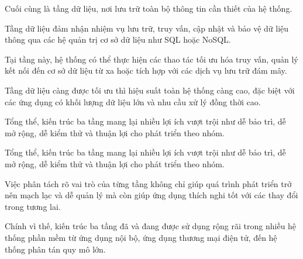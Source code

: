     \begin{flushleft}
      \hspace*{0.8cm}Cuối cùng là tầng dữ liệu, nơi lưu trữ toàn bộ thông tin cần thiết của hệ thống.
    \end{flushleft}

    \begin{flushleft}
      \hspace*{0.8cm}Tầng dữ liệu đảm nhận nhiệm vụ lưu trữ, truy vấn, cập nhật và bảo vệ dữ liệu thông qua các hệ quản trị cơ sở dữ liệu như SQL hoặc NoSQL.
    \end{flushleft}

    \begin{flushleft}
      \hspace*{0.8cm}Tại tầng này, hệ thống có thể thực hiện các thao tác tối ưu hóa truy vấn, quản lý kết nối đến cơ sở dữ liệu từ xa hoặc tích hợp với các dịch vụ lưu trữ đám mây.
    \end{flushleft}

    \begin{flushleft}
      \hspace*{0.8cm}Tầng dữ liệu càng được tối ưu thì hiệu suất toàn hệ thống càng cao, đặc biệt với các ứng dụng có khối lượng dữ liệu lớn và nhu cầu xử lý đồng thời cao.
    \end{flushleft}

    \begin{flushleft}
      \hspace*{0.8cm}Tổng thể, kiến trúc ba tầng mang lại nhiều lợi ích vượt trội như dễ bảo trì, dễ mở rộng, dễ kiểm thử và thuận lợi cho phát triển theo nhóm.
    \end{flushleft}

    \begin{flushleft}
      \hspace*{0.8cm}Tổng thể, kiến trúc ba tầng mang lại nhiều lợi ích vượt trội như dễ bảo trì, dễ mở rộng, dễ kiểm thử và thuận lợi cho phát triển theo nhóm.
    \end{flushleft}

    \begin{flushleft}
      \hspace*{0.8cm}
      Việc phân tách rõ vai trò của từng tầng không chỉ giúp quá trình phát triển trở nên mạch lạc và dễ quản lý mà còn giúp ứng dụng thích nghi tốt với các thay đổi trong tương lai.
    \end{flushleft}

    \begin{flushleft}
      \hspace*{0.8cm}Chính vì thế, kiến trúc ba tầng đã và đang được sử dụng rộng rãi trong nhiều hệ thống phần mềm từ ứng dụng nội bộ, ứng dụng thương mại điện tử, đến hệ thống phân tán quy mô lớn.
    \end{flushleft}

